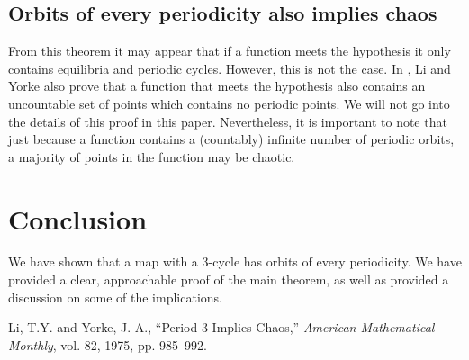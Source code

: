 \documentclass[12pt]{IEEEtran}
\begin{document}
\subsection{Orbits of every periodicity also implies chaos}
From this theorem it may appear that if a function meets the hypothesis it only contains equilibria and periodic cycles. However, this is not the case. In \cite{li}, Li and Yorke also prove that a function that meets the hypothesis also contains an uncountable set of points which contains no periodic points. We will not go into the details of this proof in this paper. Nevertheless, it is important to note that just because a function contains a (countably) infinite number of periodic orbits, a majority of points in the function may be chaotic.



\section{Conclusion}
We have shown that a map with a 3-cycle has orbits of every periodicity. We have provided a clear, approachable proof of the main theorem, as well as provided a discussion on some of the implications.




\begin{thebibliography}{1}
	 Li, T.Y. and Yorke, J. A.,
		``Period 3 Implies Chaos,''
		{\it American Mathematical Monthly},
		vol. 82, 1975, pp. 985–992.
\end{thebibliography}
\end{document}
